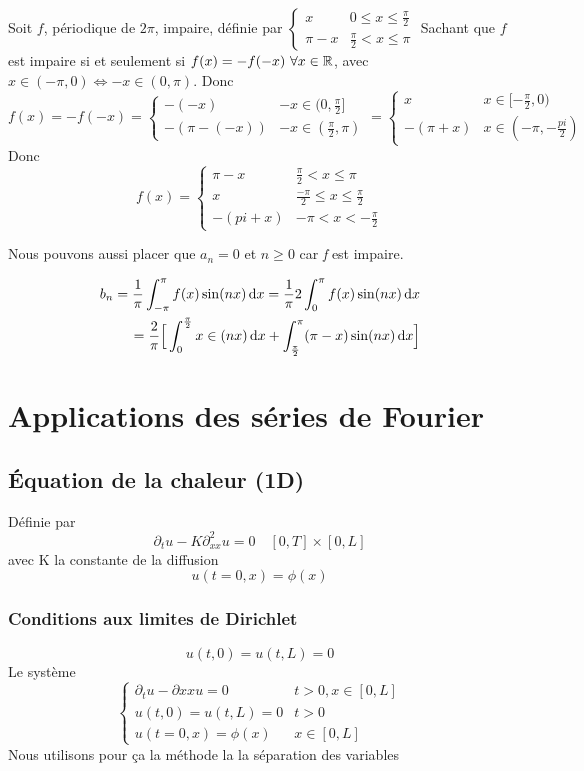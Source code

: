 \documentclass[12pt,a4paper]{article}
\begin{document}
 Soit $f$, périodique de $2\pi$, impaire, définie par $\left\{\begin{array}{ll}
	x & 0 \leq x \leq \frac{\pi}{2}\\
	\pi-x & \frac{\pi}{2} < x \leq \pi
\end{array}\right.$ Sachant que $f$ est impaire si et seulement si $f(x) = -f(-x)\ \forall x \in \R$, avec $x \in (-\pi,0) \iff -x \in (0,\pi)$. Donc 
\[
	f(x) = -f(-x) = 
	\left\{\begin{array}{ll}
		-(-x) & -x \in (0,\frac{\pi}{2}]\\
		-(\pi-(-x)) & -x \in (\frac{\pi}{2},\pi)
	\end{array}\right. 
	=
	\left\{\begin{array}{ll}
		x & x\in [-\frac{\pi}{2},0)\\
		-(\pi+x) & x\in (-\pi,-\frac{pi}{2})
	\end{array}\right.
\]
Donc 
\[
	f(x) = 
	\left\{
		\begin{array}{ll}
			\pi-x &\frac{\pi}{2} < x \leq \pi\\
			x & \frac{-\pi}{2} \leq x \leq \frac{\pi}{2}\\
			-(pi+x) & -\pi < x < -\frac{\pi}{2}
		\end{array}
	\right.
\]

Nous pouvons aussi placer que $a_n = 0$ et $n\geq 0$ car \textit{f} est impaire.

\begin{align*}
	b_n = \frac{1}{\pi} \int_{-\pi}^\pi f(x) \sin(nx) \, \mathrm d x = \frac{1}{\pi} 2 \int_0^\pi f(x) \sin(nx) \, \mathrm d x \\
	= \frac{2}{\pi} \Big[\int_0^{\frac{\pi}{2}} x\in(nx) \, \mathrm d x + \int_{\frac{\pi}{2}}^\pi (\pi-x) \sin(nx) \, \mathrm d x \Big]
\end{align*}

\section{Applications des séries de Fourier}
\subsection{Équation de la chaleur (1D)}
Définie par 
\[\partial_t u -K\partial_{xx}^2u = 0 \quad [0,T]\times[0,L]\]
avec K la constante de la diffusion
\[u(t=0, x) = \phi(x)\]
\subsubsection{Conditions aux limites de Dirichlet}
\[u(t, 0) = u(t,L) = 0\]
Le système
\[\left\{\begin{array}{ll}
	\partial_t u - \partial {xx} u = 0 & t > 0, x \in [0,L]\\
	u(t,0) = u(t,L) = 0 & t > 0\\
	u(t = 0, x) = \phi(x) & x \in [0,L]
\end{array}\right.\]
Nous utilisons pour ça la méthode la la séparation des variables
\end{document}
